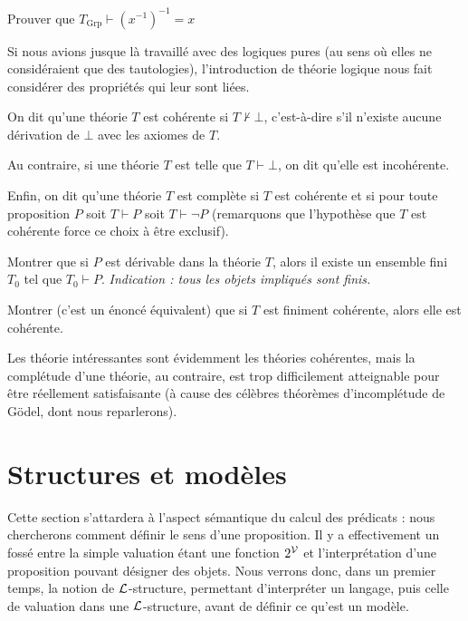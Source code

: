 \begin{exo}
    Prouver que $T_{\mathrm{Grp}}\vdash (x^{-1})^{-1}=x$
\end{exo}

Si nous avions jusque là travaillé avec des logiques \og pures\fg{} (au sens où elles ne considéraient que des tautologies), l'introduction de théorie logique nous fait considérer des propriétés qui leur sont liées.

\begin{defi}
    On dit qu'une théorie $T$ est cohérente si $T\nvdash \bot$, c'est-à-dire s'il n'existe aucune dérivation de $\bot$ avec les axiomes de $T$.

    Au contraire, si une théorie $T$ est telle que $T\vdash \bot$, on dit qu'elle est incohérente.

    Enfin, on dit qu'une théorie $T$ est complète si $T$ est cohérente et si pour toute proposition $P$ soit $T\vdash P$ soit $T\vdash \lnot P$ (remarquons que l'hypothèse que $T$ est cohérente force ce choix à être exclusif).
\end{defi}

\begin{exo}\label{exo:compacitesynt}
    Montrer que si $P$ est dérivable dans la théorie $T$, alors il existe un ensemble fini $T_0$ tel que $T_0\vdash P$. \textit{Indication : tous les objets impliqués sont finis.}

    Montrer (c'est un énoncé équivalent) que si $T$ est finiment cohérente, alors elle est cohérente.
\end{exo}

Les théorie intéressantes sont évidemment les théories cohérentes, mais la complétude d'une théorie, au contraire, est trop difficilement atteignable pour être réellement satisfaisante (à cause des célèbres théorèmes d'incomplétude de Gödel, dont nous reparlerons).

\section{Structures et modèles}

Cette section s'attardera à l'aspect sémantique du calcul des prédicats : nous chercherons comment définir le sens d'une proposition. Il y a effectivement un fossé entre la simple valuation étant une fonction $2^\mathcal V$ et l'interprétation d'une proposition pouvant désigner des objets. Nous verrons donc, dans un premier temps, la notion de $\mathcal L$-structure, permettant d'interpréter un langage, puis celle de valuation dans une $\mathcal L$-structure, avant de définir ce qu'est un modèle.


